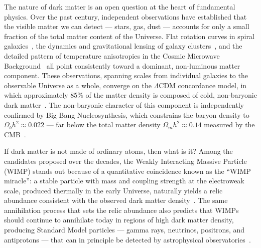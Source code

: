 
The nature of dark matter is an open question at the heart of fundamental physics.
Over the past century, independent observations have established that the visible matter we can detect --- stars, gas, dust --- accounts for only a small fraction of the total matter content of the Universe.
Flat rotation curves in spiral galaxies~\cite{Rubin:1970zza,Persic:1995ru}, the dynamics and gravitational lensing of galaxy clusters~\cite{Clowe:2006eq}, and the detailed pattern of temperature anisotropies in the Cosmic Microwave Background~\cite{Aghanim:2018eyx} all point consistently toward a dominant, non-luminous matter component.
These observations, spanning scales from individual galaxies to the observable Universe as a whole, converge on the $\Lambda$CDM concordance model, in which approximately 85\% of the matter density is composed of cold, non-baryonic dark matter~\cite{Aghanim:2018eyx}.
The non-baryonic character of this component is independently confirmed by Big Bang Nucleosynthesis, which constrains the baryon density to $\Omega_b h^2 \approx 0.022$ --- far below the total matter density $\Omega_m h^2 \approx 0.14$ measured by the CMB~\cite{Cirelli:2024ssz}.

If dark matter is not made of ordinary atoms, then what is it?
Among the candidates proposed over the decades, the Weakly Interacting Massive Particle (WIMP) stands out because of a quantitative coincidence known as the ``WIMP miracle'': a stable particle with mass and coupling strength at the electroweak scale, produced thermally in the early Universe, naturally yields a relic abundance consistent with the observed dark matter density~\cite{Cirelli:2024ssz,Steigman:2012nb}.
The same annihilation process that sets the relic abundance also predicts that WIMPs should continue to annihilate today in regions of high dark matter density, producing Standard Model particles --- gamma rays, neutrinos, positrons, and antiprotons --- that can in principle be detected by astrophysical observatories~\cite{Cirelli:2024ssz,Bergstrom:1997fj}.

